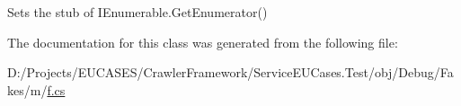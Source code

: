 Sets the stub of I\-Enumerable.\-Get\-Enumerator()



The documentation for this class was generated from the following file\-:\begin{DoxyCompactItemize}
\item 
D\-:/\-Projects/\-E\-U\-C\-A\-S\-E\-S/\-Crawler\-Framework/\-Service\-E\-U\-Cases.\-Test/obj/\-Debug/\-Fakes/m/\hyperlink{m_2f_8cs}{f.\-cs}\end{DoxyCompactItemize}
